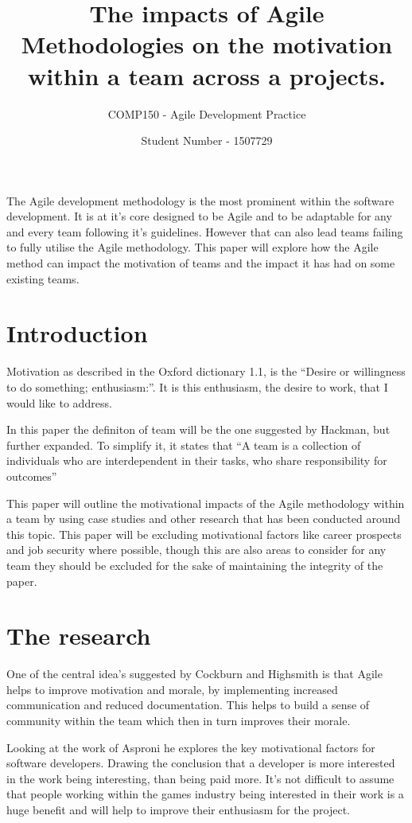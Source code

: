 \documentclass{scrartcl}
\title{The impacts of Agile Methodologies on the motivation within a team across a projects.}
\subtitle{COMP150 - Agile Development Practice}
\author{Student Number - 1507729}
\begin{document}
\maketitle

\abstract The Agile development methodology is the most prominent within the software development. It is at it's core designed to be Agile and to be adaptable for any and every team following it's guidelines. However that can also lead teams failing to fully utilise the Agile methodology. This paper will explore how the Agile method can impact the motivation of teams and the impact it has had on some existing teams.

\section{Introduction}
Motivation as described in the Oxford dictionary 1.1, is the ``Desire or willingness to do something; enthusiasm:''. It is this enthusiasm, the desire to work, that I would like to address.

In this paper the definiton of team will be the one suggested by Hackman, but further expanded. \cite{GroupExec} To simplify it, it  states that ``A team is a collection of individuals who are interdependent in their tasks, who share responsibility for outcomes'' 

This paper will outline the motivational impacts of the Agile methodology \cite{Agile} within a team by using case studies and other research that has been conducted around this topic. This paper will be excluding motivational factors like career prospects and job security where possible, though this are also areas to consider for any team they should be excluded for the sake of maintaining the integrity of the paper. 

\section{The research}
One of the central idea's suggested by Cockburn and Highsmith \cite{AgilePeople} is that Agile helps to improve motivation and morale, by implementing increased communication and reduced documentation. This helps to build a sense of community within the team which then in turn improves their morale.

Looking at the work of Asproni \cite{MotivationSoftware} he explores the key motivational factors for software developers. Drawing the conclusion that a developer is more interested in the work being interesting, than being paid more. It's not difficult to assume that people working within the games industry being interested in their work is a huge benefit and will help to improve their enthusiasm for the project. 
\end{document}
